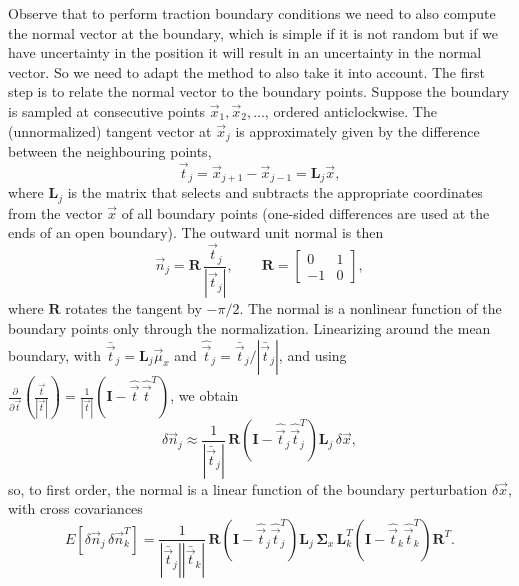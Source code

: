 \documentclass{article}
\begin{document}
Observe that to perform traction boundary conditions we need to also compute the normal vector at the boundary, which is simple if it is not random but if we have uncertainty in the position it will result in an uncertainty in the normal vector. So we need to adapt the method to also take it into account. The first step is to relate the normal vector to the boundary points. Suppose the boundary is sampled at consecutive points $\vec x_1, \vec x_2, \ldots$, ordered anticlockwise. The (unnormalized) tangent vector at $\vec x_j$ is approximately given by the difference between the neighbouring points,
\begin{equation}
    \vec t_j = \vec x_{j+1} - \vec x_{j-1} = \mathbf{L}_j \vec{x},
\end{equation}
where $\mathbf{L}_j$ is the matrix that selects and subtracts the appropriate coordinates from the vector $\vec x$ of all boundary points (one-sided differences are used at the ends of an open boundary). The outward unit normal is then
\begin{equation}
    \vec n_j = \mathbf{R}\,\frac{\vec t_j}{|\vec t_j|}, \qquad \mathbf{R} = \begin{bmatrix} 0 & 1\\ -1 & 0\end{bmatrix},
\end{equation}
where $\mathbf{R}$ rotates the tangent by $-\pi/2$. The normal is a nonlinear function of the boundary points only through the normalization. Linearizing around the mean boundary, with $\bar{\vec t}_j = \mathbf{L}_j \vec\mu_x$ and $\hat{\vec t}_j = \bar{\vec t}_j/|\bar{\vec t}_j|$, and using $\frac{\partial}{\partial \vec t}\left(\frac{\vec t}{|\vec t|}\right) = \frac{1}{|\vec t|}\left(\mathbf{I} - \hat{\vec t}\,\hat{\vec t}^T\right)$, we obtain
\begin{equation}
    \delta \vec n_j \approx \frac{1}{|\bar{\vec t}_j|}\,\mathbf{R}\left(\mathbf{I} - \hat{\vec t}_j\hat{\vec t}_j^T\right)\mathbf{L}_j\, \delta\vec x , \label{eq:normal_linearization}
\end{equation}
so, to first order, the normal is a linear function of the boundary perturbation $\delta \vec x$, with cross covariances
\begin{equation}
    E[\delta\vec n_j \,\delta \vec n_k^T] = \frac{1}{|\bar{\vec t}_j||\bar{\vec t}_k|}\, \mathbf{R}\left(\mathbf{I} - \hat{\vec t}_j\hat{\vec t}_j^T\right)\mathbf{L}_j \,\mathbf{\Sigma}_x\, \mathbf{L}_k^T \left(\mathbf{I} - \hat{\vec t}_k\hat{\vec t}_k^T\right)\mathbf{R}^T.
\end{equation}
\end{document}
